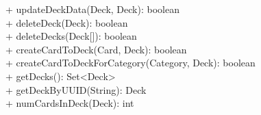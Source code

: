 {
    + updateDeckData(Deck, Deck): boolean \\
    + deleteDeck(Deck): boolean \\
    + deleteDecks(Deck[]): boolean \\
    + createCardToDeck(Card, Deck): boolean \\
    + createCardToDeckForCategory(Category, Deck): boolean \\
    + getDecks(): Set<Deck> \\
    + getDeckByUUID(String): Deck \\
    + numCardsInDeck(Deck): int
}{}
 